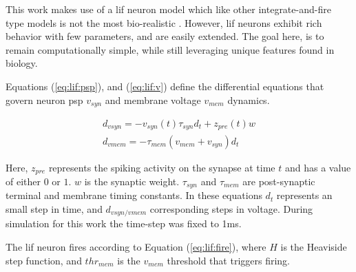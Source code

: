 \documentclass[conference]{IEEEtran}
\newcommand{\eq}[1]{Equation (\ref{#1})}
\begin{document}




This work makes use of a \gls{lif} neuron model which like other
integrate-and-fire type models is not the most bio-realistic
\parencite{izhikevich_2004}. However, \gls{lif} neurons exhibit rich behavior
with few parameters, and are easily extended. The goal here, is to remain
computationally simple, while still leveraging unique features found in biology.

Equations (\ref{eq:lif:psp}), and (\ref{eq:lif:v}) define the differential equations that
govern neuron \gls{psp} $v_{syn}$ and membrane voltage $v_{mem}$
dynamics.

\begin{align}
d_{vsyn} = -v_{syn}(t) \tau_{syn} d_t + z_{pre}(t) w \label{eq:lif:psp} \\
d_{vmem} = -\tau_{mem} (v_{mem} + v_{syn}) d_t \label{eq:lif:v}
\end{align}

Here, $z_{pre}$ represents the spiking activity on the synapse at time $t$ and
has a value of either $0$ or $1$. $w$ is the synaptic weight. $\tau_{syn}$ and
$\tau_{mem}$ are post-synaptic terminal and membrane timing constants. In these
equations $d_t$ represents an small step in time, and $d_{vsyn/vmem}$
corresponding steps in voltage. During simulation for this work the time-step
was fixed to 1ms.

The \gls{lif} neuron fires according to \eq{eq:lif:fire}, where $H$ is the
Heaviside step function, and $thr_{mem}$ is the $v_{mem}$ threshold that
triggers firing.
\end{document}

